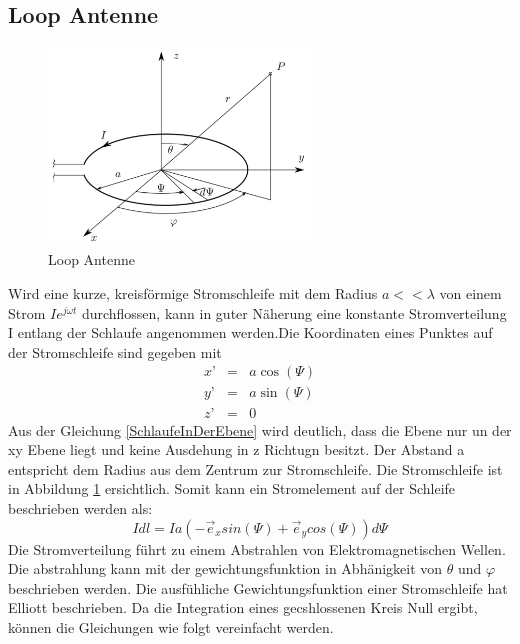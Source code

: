 \newpage
\subsection{Loop Antenne}\label{sec:LoopAntenneTheorie}
\begin{figure}[h]
	\centering
	\includegraphics[width=7cm]{content/bilder/Loop_EMANT_S45.pdf}%
	\caption{Loop Antenne}
	\label{LoopAntenne}
\end{figure}
Wird eine kurze, kreisförmige Stromschleife mit dem Radius $a<<\lambda$ von einem Strom $Ie^{j\omega t}$ durchflossen,  kann in guter Näherung eine konstante Stromverteilung I entlang der Schlaufe angenommen werden.Die Koordinaten eines Punktes auf der Stromschleife sind gegeben mit
\begin{eqnarray}
x’ &=&a \cos(\Psi)\\
y’ &=&a \sin(\Psi)\\
z’ &=&0\label{SchlaufeInDerEbene}
\end{eqnarray}
Aus der Gleichung \ref{SchlaufeInDerEbene} wird deutlich, dass die Ebene nur un der xy Ebene liegt und keine Ausdehung in z Richtugn besitzt.
Der Abstand  a entspricht dem Radius  aus dem Zentrum zur Stromschleife. Die Stromschleife ist in  Abbildung \ref{LoopAntenne} ersichtlich. Somit kann ein Stromelement auf der Schleife beschrieben werden als:
\begin{equation}
I dl= Ia(- \vec e_{x}sin(\Psi)+\vec e_{y}cos(\Psi))d\Psi
\end{equation}
Die Stromverteilung führt zu einem Abstrahlen von Elektromagnetischen Wellen. Die abstrahlung kann mit der gewichtungsfunktion in Abhänigkeit von $\theta$ und $\varphi$ beschrieben werden. Die ausfühliche Gewichtungsfunktion einer Stromschleife hat Elliott \cite{elliott1981antenna}beschrieben. Da die Integration eines gecshlossenen Kreis Null ergibt, können die Gleichungen wie folgt vereinfacht werden.

